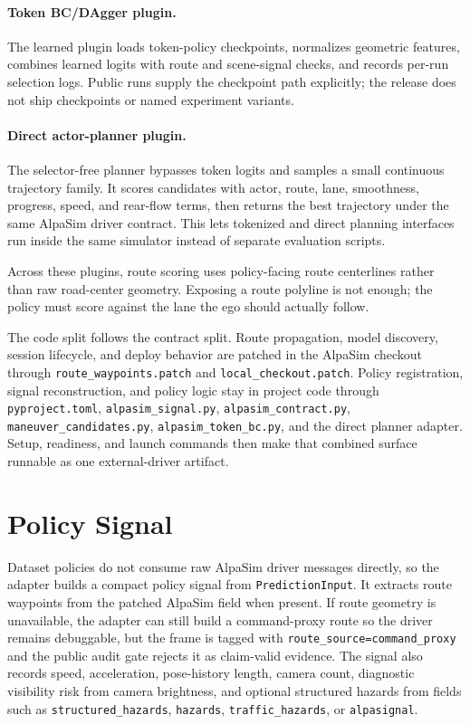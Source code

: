 \documentclass{article}
\begin{document}
\paragraph{Token BC/DAgger plugin.}
The learned plugin loads token-policy checkpoints, normalizes geometric features,
combines learned logits with route and scene-signal checks, and records per-run
selection logs. Public runs supply the checkpoint path explicitly; the release does not
ship checkpoints or named experiment variants.

\paragraph{Direct actor-planner plugin.}
The selector-free planner bypasses token logits and samples a small continuous trajectory
family. It scores candidates with actor, route, lane, smoothness, progress, speed, and
rear-flow terms, then returns the best trajectory under the same AlpaSim driver contract.
This lets tokenized and direct planning interfaces run inside the same simulator instead
of separate evaluation scripts.

Across these plugins, route scoring uses policy-facing route centerlines rather than raw
road-center geometry. Exposing a route polyline is not enough; the policy must score
against the lane the ego should actually follow.

The code split follows the contract split. Route propagation, model discovery, session
lifecycle, and deploy behavior are patched in the AlpaSim checkout through
\texttt{route\_waypoints.patch} and \texttt{local\_checkout.patch}. Policy registration,
signal reconstruction, and policy logic stay in project code through
\texttt{pyproject.toml}, \texttt{alpasim\_signal.py}, \texttt{alpasim\_contract.py},
\texttt{maneuver\_candidates.py}, \texttt{alpasim\_token\_bc.py}, and the direct planner adapter. Setup, readiness, and
launch commands then make that combined surface runnable as one external-driver artifact.

\section{Policy Signal}

Dataset policies do not consume raw AlpaSim driver messages directly, so the adapter
builds a compact policy signal from \texttt{PredictionInput}. It extracts route
waypoints from the patched AlpaSim field when present. If route geometry is unavailable,
the adapter can still build a command-proxy route so the driver remains debuggable, but
the frame is tagged with \texttt{route\_source=command\_proxy} and the public audit gate
rejects it as claim-valid evidence. The signal also records speed, acceleration,
pose-history length, camera count, diagnostic visibility risk from camera brightness,
and optional structured hazards from fields such as
\texttt{structured\_hazards}, \texttt{hazards}, \texttt{traffic\_hazards}, or
\texttt{alpasignal}.
\end{document}
